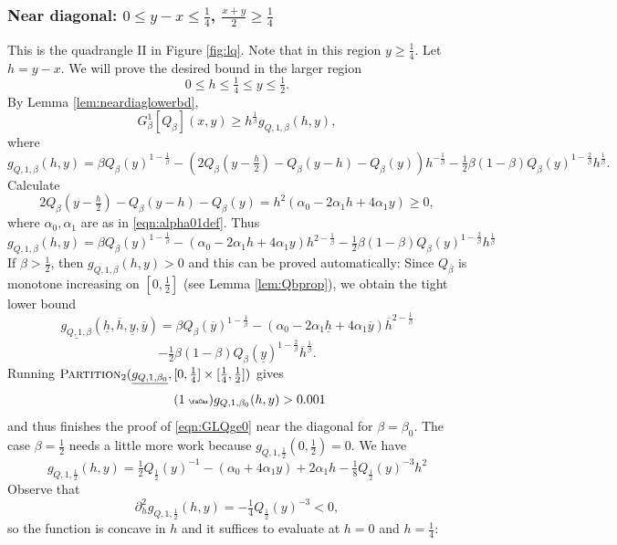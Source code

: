 \documentclass[12pt]{amsart}
\theoremstyle{plain}
\newcommand{\auto}{\tag{\addtocounter{equation}{1}\theequation\;{\tiny\faCar}}}
\theoremstyle{definition}
\theoremstyle{remark}
\numberwithin{equation}{section}
\begin{document}
\subsubsection{Near diagonal: $0\le y-x\le \tfrac14$, $\frac{x+y}2\ge \frac14$}
\label{sec:Q-II}
This is the quadrangle II in Figure \ref{fig:lq}. Note that in this region $y\ge \frac14$.
Let $h=y-x$.
We will prove the desired bound in the larger region
\[ 0\le h\le \tfrac14\le y\le \tfrac12. \]
By Lemma \ref{lem:neardiaglowerbd},
\[ G^1_\beta[Q_\beta](x,y)\ge h^{\frac1\beta} g_{Q,1,\beta}(h,y),\]
where
\[ g_{Q,1,\beta}(h,y)= \beta Q_\beta(y)^{1-\frac1\beta} - (2Q_\beta(y-\tfrac{h}2)-Q_\beta(y-h)-Q_\beta(y))h^{-\frac1\beta} - \tfrac12 \beta (1-\beta) Q_\beta(y)^{1-\frac2\beta} h^{\frac1\beta}. \]
Calculate
\[ 2Q_\beta(y-\tfrac{h}2)-Q_\beta(y-h)-Q_\beta(y) = h^2 (\alpha_0 - 2\alpha_1 h + 4\alpha_1 y) \ge 0, \]
where $\alpha_0,\alpha_1$ are as in \eqref{eqn:alpha01def}.
Thus
\[ g_{Q,1,\beta}(h,y) = \beta Q_\beta(y)^{1-\frac1\beta} - (\alpha_0-2\alpha_1 h+4\alpha_1 y)h^{2-\frac1\beta} - \tfrac12 \beta (1-\beta) Q_\beta(y)^{1-\frac2\beta} h^{\frac1\beta} \]
If $\beta>\tfrac12$, then $g_{Q,1,\beta}(h,y)>0$ and this can be proved automatically: 
Since $Q_\beta$ is monotone increasing on $[0,\tfrac12]$ (see Lemma \ref{lem:Qbprop}), we obtain the tight lower bound
 \[ \underline{g_{Q,1,\beta}}(\underline{h},\overline{h},\underline{y},\overline{y}) = \beta Q_\beta(\overline{y})^{1-\frac1\beta} - (\alpha_0 - 2\alpha_1 \underline{h} + 4\alpha_1 \overline{y})\overline{h}^{2-\frac1\beta} \] 
\[- \tfrac12 \beta (1-\beta)Q_\beta(\underline{y})^{1-\frac2\beta} \overline{h}^{\frac1\beta}. \]
Running $\textsc{Partition}_2(\underline{g_{Q,1,\beta_0}},[0,\tfrac14]\times[\tfrac14,\tfrac12])$ gives 
\begin{equation}\label{eqn:g_Q_1_auto}\auto
g_{Q,1,\beta_0}(h,y)>0.001
\end{equation}
and thus finishes the proof of \eqref{eqn:GLQge0} near the diagonal for $\beta=\beta_0$. 
The case $\beta=\frac12$ needs 
a little more work because
$g_{Q,1,\frac12}(0,\tfrac12)=0$.
We have
\[ g_{Q,1,\frac12}(h,y) = \tfrac12 Q_{\frac12}(y)^{-1} - (\alpha_0+4\alpha_1 y) + 2\alpha_1 h - \tfrac18 Q_{\frac12}(y)^{-3} h^2\]
Observe that 
\[\partial_h^2 g_{Q,1,\frac12}(h,y)=-\tfrac14 Q_{\frac12}(y)^{-3}<0,\]
so the function is concave in $h$ and it suffices to evaluate at $h=0$ and $h=\tfrac14$:
\end{document}
